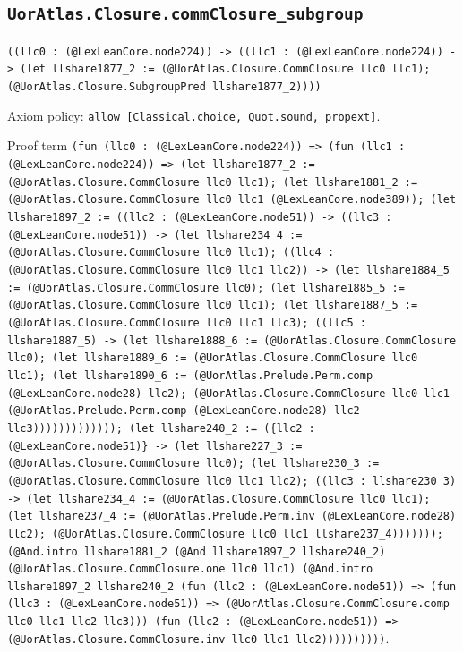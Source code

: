 \documentclass[11pt]{article}
\begin{document}
\subsection*{\texttt{UorAtlas.Closure.commClosure\_subgroup}}
\noindent\texttt{((llc0 : (@LexLeanCore.node224)) -> ((llc1 : (@LexLeanCore.node224)) -> (let llshare1877\_2 := (@UorAtlas.Closure.CommClosure llc0 llc1); (@UorAtlas.Closure.SubgroupPred llshare1877\_2))))}\par
\noindent Axiom policy: \texttt{allow [Classical.choice, Quot.sound, propext]}.\par
\noindent Proof term \texttt{(fun (llc0 : (@LexLeanCore.node224)) => (fun (llc1 : (@LexLeanCore.node224)) => (let llshare1877\_2 := (@UorAtlas.Closure.CommClosure llc0 llc1); (let llshare1881\_2 := (@UorAtlas.Closure.CommClosure llc0 llc1 (@LexLeanCore.node389)); (let llshare1897\_2 := ((llc2 : (@LexLeanCore.node51)) -> ((llc3 : (@LexLeanCore.node51)) -> (let llshare234\_4 := (@UorAtlas.Closure.CommClosure llc0 llc1); ((llc4 : (@UorAtlas.Closure.CommClosure llc0 llc1 llc2)) -> (let llshare1884\_5 := (@UorAtlas.Closure.CommClosure llc0); (let llshare1885\_5 := (@UorAtlas.Closure.CommClosure llc0 llc1); (let llshare1887\_5 := (@UorAtlas.Closure.CommClosure llc0 llc1 llc3); ((llc5 : llshare1887\_5) -> (let llshare1888\_6 := (@UorAtlas.Closure.CommClosure llc0); (let llshare1889\_6 := (@UorAtlas.Closure.CommClosure llc0 llc1); (let llshare1890\_6 := (@UorAtlas.Prelude.Perm.comp (@LexLeanCore.node28) llc2); (@UorAtlas.Closure.CommClosure llc0 llc1 (@UorAtlas.Prelude.Perm.comp (@LexLeanCore.node28) llc2 llc3))))))))))))); (let llshare240\_2 := (\{llc2 : (@LexLeanCore.node51)\} -> (let llshare227\_3 := (@UorAtlas.Closure.CommClosure llc0); (let llshare230\_3 := (@UorAtlas.Closure.CommClosure llc0 llc1 llc2); ((llc3 : llshare230\_3) -> (let llshare234\_4 := (@UorAtlas.Closure.CommClosure llc0 llc1); (let llshare237\_4 := (@UorAtlas.Prelude.Perm.inv (@LexLeanCore.node28) llc2); (@UorAtlas.Closure.CommClosure llc0 llc1 llshare237\_4))))))); (@And.intro llshare1881\_2 (@And llshare1897\_2 llshare240\_2) (@UorAtlas.Closure.CommClosure.one llc0 llc1) (@And.intro llshare1897\_2 llshare240\_2 (fun (llc2 : (@LexLeanCore.node51)) => (fun (llc3 : (@LexLeanCore.node51)) => (@UorAtlas.Closure.CommClosure.comp llc0 llc1 llc2 llc3))) (fun (llc2 : (@LexLeanCore.node51)) => (@UorAtlas.Closure.CommClosure.inv llc0 llc1 llc2))))))))))}.\par
\end{document}
